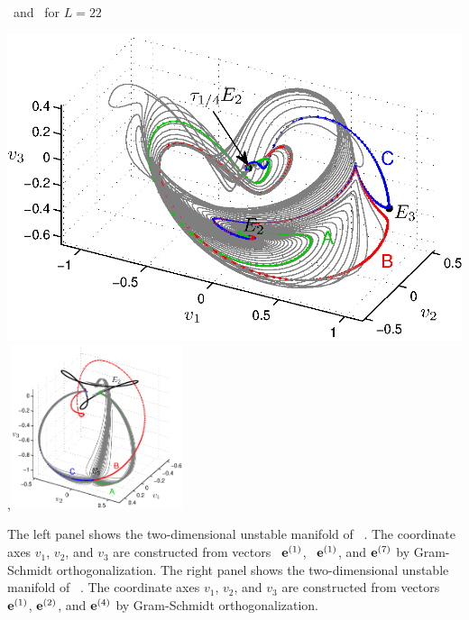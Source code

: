 \documentclass{theo1poster}[2003/04/25]
\begin{document}
\begin{poster}{3}
\begin{sheet}{\Eqva\ and \reqva\ for $L=22$}
\centerline{\includegraphics[width=.48\textwidth]{../../figs/ks22_E2_manifold_c.eps},\includegraphics[width=0.38\textwidth]{../../figs/ks22_E3_manifold.eps}}
The left panel shows the two-dimensional
unstable manifold of \eqv\ . The coordinate axes
$v_1$, $v_2$, and $v_3$ are constructed from vectors
\Re\, ${\mathbf e}^{(1)}$, \Im\, ${\mathbf e}^{(1)}$, and ${\mathbf e}^{(7)}$
by Gram-Schmidt orthogonalization. The right panel shows the two-dimensional
unstable manifold of \eqv\ . The coordinate axes
$v_1$, $v_2$, and $v_3$ are constructed from vectors
${\mathbf e}^{(1)}$, ${\mathbf e}^{(2)}$, and ${\mathbf e}^{(4)}$ by Gram-Schmidt orthogonalization.

\end{sheet}


\end{poster}
\end{document}
